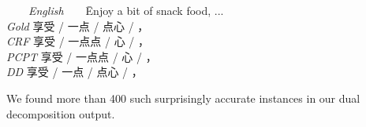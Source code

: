 \begin{tabbing}
\ \ \ \ \= \emph{English}\ \ \ \ \= Enjoy a bit of snack food, ... \\
\> \emph{Gold} \>  享受 / 一点 / 点心 /  ，\\
\> \emph{CRF} \> 享受 / 一点点 / 心 / ，\\
\> \emph{PCPT} \> 享受 / 一点点 / 心 / ， \\
\> \emph{DD} \>  享受 / 一点 / 点心 / ，\\
\end{tabbing}
We found more than 400 such surprisingly accurate instances in our dual decomposition output.
%
%
%
